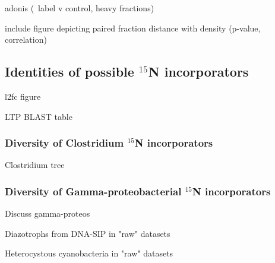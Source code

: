 adonis (~label v control, heavy fractions)

include figure depicting paired fraction distance with density (p-value, correlation)

\subsection{Identities of possible $^{15}$N incorporators}

l2fc figure

LTP BLAST table

\subsubsection{Diversity of Clostridium $^{15}$N incorporators}

Clostridium tree

\subsubsection{Diversity of Gamma-proteobacterial $^{15}$N incorporators}

Discuss gamma-proteos

Diazotrophs from DNA-SIP in "raw" datasets

Heterocystous cyanobacteria in "raw" datasets



